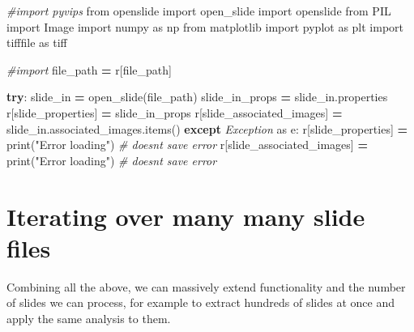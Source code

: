 \documentclass[
]{book}
\newenvironment{Shaded}{\begin{snugshade}}{\end{snugshade}}
\newcommand{\BuiltInTok}[1]{#1}
\newcommand{\CommentTok}[1]{\textcolor[rgb]{0.56,0.35,0.01}{\textit{#1}}}
\newcommand{\ControlFlowTok}[1]{\textcolor[rgb]{0.13,0.29,0.53}{\textbf{#1}}}
\newcommand{\ImportTok}[1]{#1}
\newcommand{\NormalTok}[1]{#1}
\newcommand{\OperatorTok}[1]{\textcolor[rgb]{0.81,0.36,0.00}{\textbf{#1}}}
\newcommand{\PreprocessorTok}[1]{\textcolor[rgb]{0.56,0.35,0.01}{\textit{#1}}}
\newcommand{\StringTok}[1]{\textcolor[rgb]{0.31,0.60,0.02}{#1}}
\begin{document}
\begin{Shaded}
\begin{Highlighting}[]
\CommentTok{\#import pyvips}
\ImportTok{from}\NormalTok{ openslide }\ImportTok{import}\NormalTok{ open\_slide}
\ImportTok{import}\NormalTok{ openslide}
\ImportTok{from}\NormalTok{ PIL }\ImportTok{import}\NormalTok{ Image}
\ImportTok{import}\NormalTok{ numpy }\ImportTok{as}\NormalTok{ np}
\ImportTok{from}\NormalTok{ matplotlib }\ImportTok{import}\NormalTok{ pyplot }\ImportTok{as}\NormalTok{ plt}
\ImportTok{import}\NormalTok{ tifffile }\ImportTok{as}\NormalTok{ tiff}

\CommentTok{\#import}
\NormalTok{file\_path }\OperatorTok{=}\NormalTok{ r[}\StringTok{\textquotesingle{}file\_path\textquotesingle{}}\NormalTok{]}

\ControlFlowTok{try}\NormalTok{:}
\NormalTok{  slide\_in }\OperatorTok{=}\NormalTok{ open\_slide(file\_path)}
\NormalTok{  slide\_in\_props }\OperatorTok{=}\NormalTok{ slide\_in.properties}
\NormalTok{  r[}\StringTok{\textquotesingle{}slide\_properties\textquotesingle{}}\NormalTok{] }\OperatorTok{=}\NormalTok{ slide\_in\_props}
\NormalTok{  r[}\StringTok{\textquotesingle{}slide\_associated\_images\textquotesingle{}}\NormalTok{] }\OperatorTok{=}\NormalTok{ slide\_in.associated\_images.items()}
\ControlFlowTok{except} \PreprocessorTok{Exception} \ImportTok{as}\NormalTok{ e:}
\NormalTok{  r[}\StringTok{\textquotesingle{}slide\_properties\textquotesingle{}}\NormalTok{] }\OperatorTok{=} \BuiltInTok{print}\NormalTok{(}\StringTok{"Error loading"}\NormalTok{) }\CommentTok{\# doesn\textquotesingle{}t save error}
\NormalTok{  r[}\StringTok{\textquotesingle{}slide\_associated\_images\textquotesingle{}}\NormalTok{] }\OperatorTok{=} \BuiltInTok{print}\NormalTok{(}\StringTok{"Error loading"}\NormalTok{) }\CommentTok{\# doesn\textquotesingle{}t save error}
\end{Highlighting}
\end{Shaded}

\hypertarget{iterating-over-many-many-slide-files}{%
\section{Iterating over many many slide files}\label{iterating-over-many-many-slide-files}}

Combining all the above, we can massively extend functionality and the number of slides we can process, for example to extract hundreds of slides at once and apply the same analysis to them.
\end{document}
